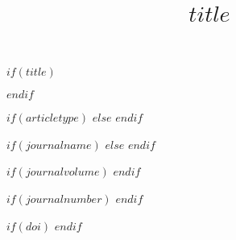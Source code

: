 $if(title)$
\title{$title$}
$endif$

$if(articletype)$
$else$
$endif$

$if(journalname)$
$else$
$endif$

$if(journalvolume)$
$endif$

$if(journalnumber)$
$endif$

$if(doi)$
$endif$